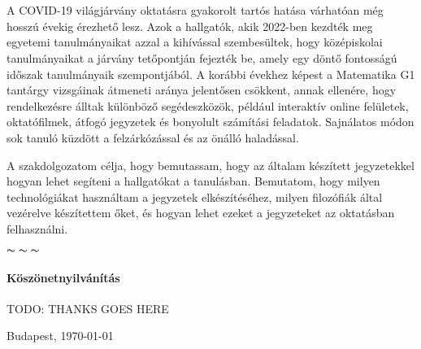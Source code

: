 \chapter*{\eloszo}

A COVID-19 világjárvány oktatásra gyakorolt tartós hatása várhatóan még hosszú
évekig érezhető lesz. Azok a hallgatók, akik 2022-ben kezdték meg egyetemi
tanulmányaikat azzal a kihívással szembesültek, hogy középiskolai tanulmányaikat
a járvány tetőpontján fejezték be, amely egy döntő fontosságú időszak
tanulmányaik szempontjából. A korábbi évekhez képest a Matematika G1
tantárgy vizsgáinak átmeneti aránya jelentősen csökkent, annak ellenére,
hogy rendelkezésre álltak különböző segédeszközök, például interaktív online
felületek, oktatófilmek, átfogó jegyzetek és bonyolult számítási feladatok.
Sajnálatos módon sok tanuló küzdött a felzárkózással és az önálló haladással.

A szakdolgozatom célja, hogy bemutassam, hogy az általam készített jegyzetekkel
hogyan lehet segíteni a hallgatókat a tanulásban. Bemutatom, hogy milyen
technológiákat használtam a jegyzetek elkészítéséhez, milyen filozófiák
által vezérelve készítettem őket, és hogyan lehet ezeket a jegyzeteket
az oktatásban felhasználni.


\begin{center}
	$\thicksim \; \thicksim \; \thicksim$
\end{center}

\subsubsection*{Köszönetnyilvánítás}

\begin{center}
	\Huge
	TODO: THANKS GOES HERE
\end{center}

\vspace{0.5cm}

\begin{flushleft}
	{Budapest, \today}
\end{flushleft}

\begin{flushright}
	\emph{\authorName}
\end{flushright}

\vfill
